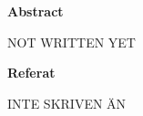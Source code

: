 \begin{center}\normalfont\Large\bfseries\centering Abstract\end{center}
NOT WRITTEN YET

\newpage

\begin{center}\normalfont\Large\bfseries\centering Referat\end{center}
INTE SKRIVEN ÄN
